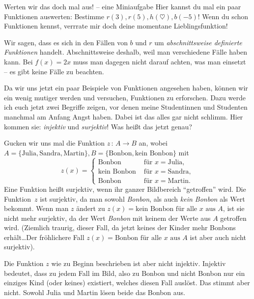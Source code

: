 \documentclass[a4paper,ngerman,12pt]{zirkelblatt1415}
\theoremstyle{definition}
\theoremstyle{remark}
\begin{document}
\begin{aufgabe}{Werten wir das doch mal aus! -- eine Miniaufgabe}
 Hier kannst du mal ein paar Funktionen auswerten:
 Bestimme $r(3), r(5), h(\heartsuit), b(-5)$!
 Wenn du schon Funktionen kennst, verrrate mir doch deine momentane Lieblingsfunktion!
\end{aufgabe}

Wir sagen, dass es sich in den Fällen von $b$ und $r$ um \emph{abschnittsweise definierte Funktionen} handelt.
Abschnittsweise deshalb, weil man verschiedene Fälle haben kann. Bei $f(x) = 2x$ muss man dagegen nicht darauf achten, was man einsetzt -- 
es gibt keine Fälle zu beachten.

Da wir uns jetzt ein paar Beispiele von Funktionen angesehen haben, 
können wir ein wenig mutiger werden und versuchen, Funktionen zu erforschen.
Dazu werde ich euch jetzt zwei Begriffe zeigen, vor denen meine Studentinnen und Studenten manchmal am Anfang Angst haben. 
Dabei ist das alles gar nicht schlimm.
Hier kommen sie: \emph{injektiv} und \emph{surjektiv}!
Was heißt das jetzt genau?

Gucken wir uns mal die Funktion $z \,:\, A \to B$ an, wobei 
$A = \{ \text{Julia}, \text{Sandra}, \text{Martin}\}, B = \{\text{Bonbon}, \text{kein Bonbon} \}$ mit 
\[ z(x) =\begin{cases} 
      \text{Bonbon} & \text{ für } x = \text{Julia}, \\
      \text{kein Bonbon}  & \text{ für } x = \text{Sandra}, \\
      \text{Bonbon} & \text{ für } x = \text{Martin}.  
  \end{cases}
\]
Eine Funktion heißt surjektiv, wenn ihr ganzer Bildbereich "`getroffen"' wird. 
Die Funktion~$z$ ist surjektiv, da man sowohl \emph{Bonbon}, als auch \emph{kein Bonbon} als Wert bekommt.
Wenn man $z$ ändert zu $z(x) = \text{kein Bonbon für alle $x$ aus }A$, ist sie nicht mehr surjektiv,
da der Wert \emph{Bonbon} mit keinem der Werte aus $A$ getroffen wird. 
(Ziemlich traurig, dieser Fall, da jetzt keines der Kinder mehr Bonbons erhält\ldots Der fröhlichere Fall 
 $z(x) = \text{Bonbon für alle $x$ aus }A$ ist aber auch nicht surjektiv).

Die Funktion $z$ wie zu Beginn beschrieben ist aber nicht injektiv. Injektiv bedeutet, dass zu jedem Fall im Bild, also zu 
Bonbon und nicht Bonbon nur ein einziges Kind (oder keines) existiert, welches diesen Fall auslöst. 
Das stimmt aber nicht. Sowohl Julia und Martin lösen beide das Bonbon aus.
\end{document}
